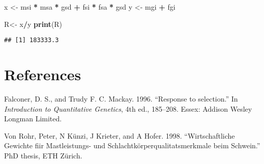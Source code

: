 \documentclass[]{article}
\newenvironment{Shaded}{\begin{snugshade}}{\end{snugshade}}
\newcommand{\KeywordTok}[1]{\textcolor[rgb]{0.13,0.29,0.53}{\textbf{#1}}}
\newcommand{\StringTok}[1]{\textcolor[rgb]{0.31,0.60,0.02}{#1}}
\newcommand{\OperatorTok}[1]{\textcolor[rgb]{0.81,0.36,0.00}{\textbf{#1}}}
\newcommand{\NormalTok}[1]{#1}
\begin{document}
\begin{Shaded}
\begin{Highlighting}[]
\NormalTok{x <-}\StringTok{ }\NormalTok{msi }\OperatorTok{*}\StringTok{ }\NormalTok{msa }\OperatorTok{*}\StringTok{ }\NormalTok{gsd }\OperatorTok{+}\StringTok{ }\NormalTok{fsi }\OperatorTok{*}\StringTok{ }\NormalTok{fsa }\OperatorTok{*}\StringTok{ }\NormalTok{gsd}
\NormalTok{y <-}\StringTok{ }\NormalTok{mgi }\OperatorTok{+}\StringTok{ }\NormalTok{fgi}

\NormalTok{R<-}\StringTok{ }\NormalTok{x}\OperatorTok{/}\NormalTok{y}
\KeywordTok{print}\NormalTok{(R)}
\end{Highlighting}
\end{Shaded}

\begin{verbatim}
## [1] 183333.3
\end{verbatim}

\section*{References}\label{references}

\hypertarget{refs}{}
\hypertarget{ref-Falconer1996}{}
Falconer, D. S., and Trudy F. C. Mackay. 1996. ``Response to
selection.'' In \emph{Introduction to Quantitative Genetics}, 4th ed.,
185--208. Essex: Addison Wesley Longman Limited.

\hypertarget{ref-VonRohr1998}{}
Von Rohr, Peter, N Künzi, J Krieter, and A Hofer. 1998.
``Wirtschaftliche Gewichte fiir Mastleistungs- und
Schlachtkörperqualitatsmerkmale beim Schwein.'' PhD thesis, ETH Zürich.
\end{document}
